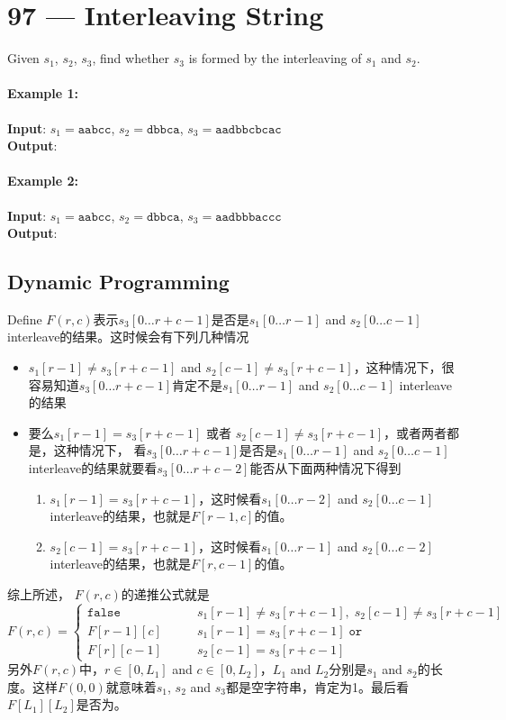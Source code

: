 \section{97 --- Interleaving String}
Given $s_1$, $s_2$, $s_3$, find whether $s_3$ is formed by the interleaving of $s_1$ and $s_2$.
\paragraph{Example 1:}
\begin{flushleft}
\textbf{Input}: $s_1 = \texttt{aabcc}$, $s_2 = \texttt{dbbca}$, $s_3 = \texttt{aadbbcbcac}$
\\
\textbf{Output}: 
\end{flushleft}
\paragraph{Example 2:}
\begin{flushleft}
\textbf{Input}: $s_1 = \texttt{aabcc}$, $s_2 = \texttt{dbbca}$, $s_3 = \texttt{aadbbbaccc}$
\\
\textbf{Output}: 
\end{flushleft}
\subsection{Dynamic Programming}
Define $F(r,c)$表示$s_3[0\ldots r+c-1]$是否是$s_1[0\ldots r-1]$ and $s_2[0\ldots c-1]$ interleave的结果。这时候会有下列几种情况
\begin{itemize}
\item $s_1[r-1]\neq s_3[r+c-1]$ and $s_2[c-1]\neq s_3[r+c-1]$，这种情况下，很容易知道$s_3[0\ldots r+c-1]$肯定不是$s_1[0\ldots r-1]$ and $s_2[0\ldots c-1]$ interleave的结果
\item 要么$s_1[r-1] = s_3[r+c-1]$ 或者 $s_2[c-1]\neq s_3[r+c-1]$，或者两者都是，这种情况下， 看$s_3[0\ldots r+c-1]$是否是$s_1[0\ldots r-1]$ and $s_2[0\ldots c-1]$ interleave的结果就要看$s_3[0\ldots r+c-2]$能否从下面两种情况下得到
\begin{enumerate}
\item $s_1[r-1] = s_3[r+c-1]$，这时候看$s_1[0\ldots r-2]$ and $s_2[0\ldots c-1]$ interleave的结果，也就是$F[r-1,c]$的值。
\item $s_2[c-1] = s_3[r+c-1]$，这时候看$s_1[0\ldots r-1]$ and $s_2[0\ldots c-2]$ interleave的结果，也就是$F[r,c-1]$的值。
\end{enumerate}
\end{itemize}
综上所述， $F(r,c)$的递推公式就是
\[
F(r,c) = 
\begin{cases}
\texttt{false} &\qquad s_1[r-1]\neq s_3[r+c-1], \;s_2[c-1]\neq s_3[r+c-1]\\
F[r-1][c] &\qquad s_1[r-1]= s_3[r+c-1] \; \texttt{or} \\
F[r][c-1] &\qquad s_2[c-1]= s_3[r+c-1] 
\end{cases}
\]
另外$F(r,c)$中，$r \in [0, L_1]$ and $c\in[0, L_2]$，$L_1$ and $L_2$分别是$s_1$ and $s_2$的长度。这样$F(0,0)$就意味着$s_1$, $s_2$ and $s_3$都是空字符串，肯定为1。最后看$F[L_1][L_2]$是否为。

